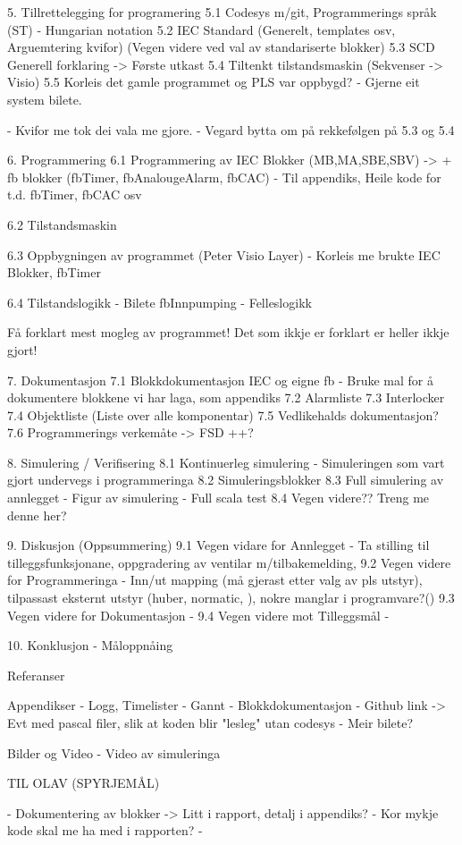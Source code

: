 5. Tillrettelegging for programering
    5.1 Codesys m/git, Programmerings språk (ST) - Hungarian notation
    5.2 IEC Standard (Generelt, templates osv, Arguemtering kvifor) (Vegen videre ved val av standariserte blokker)
    5.3 SCD Generell forklaring -> Første utkast
    5.4 Tiltenkt tilstandsmaskin (Sekvenser -> Visio)
    5.5 Korleis det gamle programmet og PLS var oppbygd?
    - Gjerne eit system bilete.
  
    - Kvifor me tok dei vala me gjore.
    - Vegard bytta om på rekkefølgen på 5.3 og 5.4


6. Programmering
    6.1 Programmering av IEC Blokker (MB,MA,SBE,SBV) -> + fb blokker (fbTimer, fbAnalougeAlarm, fbCAC)
    - Til appendiks, Heile kode for t.d. fbTimer, fbCAC osv
   
    6.2 Tilstandsmaskin

    6.3 Oppbygningen av programmet (Peter Visio Layer)
    - Korleis me brukte IEC Blokker, fbTimer

    6.4 Tilstandslogikk
    - Bilete fbInnpumping
    - Felleslogikk


    Få forklart mest mogleg av programmet!
    Det som ikkje er forklart er heller ikkje gjort!

7. Dokumentasjon
    7.1 Blokkdokumentasjon IEC og eigne fb
    - Bruke mal for å dokumentere blokkene vi har laga, som appendiks
    7.2 Alarmliste
    7.3 Interlocker
    7.4 Objektliste (Liste over alle komponentar)
    7.5 Vedlikehalds dokumentasjon? 
    7.6 Programmerings verkemåte -> FSD
    ++?


8. Simulering / Verifisering
    8.1 Kontinuerleg simulering
    - Simuleringen som vart gjort undervegs i programmeringa
    8.2 Simuleringsblokker
    8.3 Full simulering av annlegget
    - Figur av simulering
    - Full scala test
    8.4 Vegen videre?? Treng me denne her?

9. Diskusjon (Oppsummering)
    9.1 Vegen vidare for Annlegget      - Ta stilling til tilleggsfunksjonane, oppgradering av ventilar m/tilbakemelding, 
    9.2 Vegen videre for Programmeringa - Inn/ut mapping (må gjerast etter valg av pls utstyr), tilpassast eksternt utstyr (huber, normatic, ), 
                                          nokre manglar i programvare?()
    9.3 Vegen videre for Dokumentasjon  - 
    9.4 Vegen videre mot Tilleggsmål    - 

10. Konklusjon 
    - Måloppnåing


Referanser

Appendikser
- Logg, Timelister
- Gannt
- Blokkdokumentasjon
- Github link -> Evt med pascal filer, slik at koden blir "lesleg" utan codesys
- Meir bilete?

Bilder og Video
- Video av simuleringa



TIL OLAV (SPYRJEMÅL)

- Dokumentering av blokker -> Litt i rapport, detalj i appendiks?
- Kor mykje kode skal me ha med i rapporten?
- 

